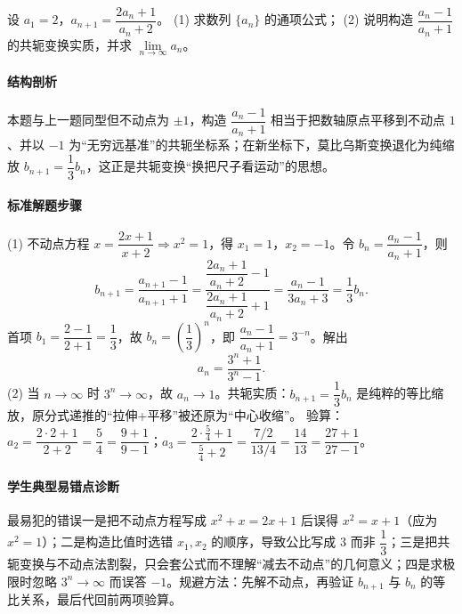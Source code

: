 \begin{problem}
设 $a_1=2$，$a_{n+1}=\dfrac{2a_n+1}{a_n+2}$。
(1) 求数列 $\{a_n\}$ 的通项公式；
(2) 说明构造 $\dfrac{a_n-1}{a_n+1}$ 的共轭变换实质，并求 $\lim\limits_{n\to\infty}a_n$。
\end{problem}
\begin{solution}
\paragraph{结构剖析}
本题与上一题同型但不动点为 $\pm1$，构造 $\dfrac{a_n-1}{a_n+1}$ 相当于把数轴原点平移到不动点 $1$、并以 $-1$ 为“无穷远基准”的共轭坐标系；在新坐标下，莫比乌斯变换退化为纯缩放 $b_{n+1}=\dfrac13b_n$，这正是共轭变换“换把尺子看运动”的思想。
\paragraph{标准解题步骤}
(1) 不动点方程 $x=\dfrac{2x+1}{x+2}\Rightarrow x^2=1$，得 $x_1=1$，$x_2=-1$。令 $b_n=\dfrac{a_n-1}{a_n+1}$，则
$$b_{n+1}=\frac{a_{n+1}-1}{a_{n+1}+1}
=\frac{\dfrac{2a_n+1}{a_n+2}-1}{\dfrac{2a_n+1}{a_n+2}+1}
=\frac{a_n-1}{3a_n+3}=\frac13b_n.$$
首项 $b_1=\dfrac{2-1}{2+1}=\dfrac13$，故 $b_n=\left(\dfrac13\right)^n$，即 $\dfrac{a_n-1}{a_n+1}=3^{-n}$。解出
$$a_n=\frac{3^n+1}{3^n-1}.$$
(2) 当 $n\to\infty$ 时 $3^n\to\infty$，故 $a_n\to1$。共轭实质：$b_{n+1}=\dfrac13b_n$ 是纯粹的等比缩放，原分式递推的“拉伸+平移”被还原为“中心收缩”。
验算：$a_2=\dfrac{2\cdot2+1}{2+2}=\dfrac54=\dfrac{9+1}{9-1}$；$a_3=\dfrac{2\cdot\frac54+1}{\frac54+2}=\dfrac{7/2}{13/4}=\dfrac{14}{13}=\dfrac{27+1}{27-1}$。
\paragraph{学生典型易错点诊断}
最易犯的错误一是把不动点方程写成 $x^2+x=2x+1$ 后误得 $x^2=x+1$（应为 $x^2=1$）；二是构造比值时选错 $x_1,x_2$ 的顺序，导致公比写成 $3$ 而非 $\dfrac13$；三是把共轭变换与不动点法割裂，只会套公式而不理解“减去不动点”的几何意义；四是求极限时忽略 $3^n\to\infty$ 而误答 $-1$。规避方法：先解不动点，再验证 $b_{n+1}$ 与 $b_n$ 的等比关系，最后代回前两项验算。
\end{solution}

